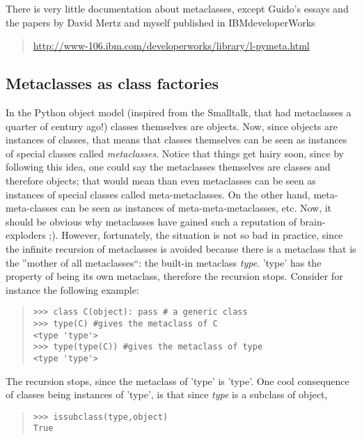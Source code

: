 \documentclass[10pt,english]{article}
\begin{document}
There is very little documentation about metaclasses, except Guido's
essays and the papers by David Mertz and myself published in IBMdeveloperWorks
\begin{quote}

\href{http://www-106.ibm.com/developerworks/library/l-pymeta.html}{http://www-106.ibm.com/developerworks/library/l-pymeta.html}
\end{quote}



\hypertarget{metaclasses-as-class-factories}{}
\subsection*{Metaclasses as class factories}

In the Python object model (inspired from the Smalltalk, that had metaclasses 
a quarter of century ago!) classes themselves are objects. 
Now, since objects are instances of classes, that means that classes 
themselves can be seen as instances of special classes called \emph{metaclasses}.
Notice that things get hairy soon, since by following this idea, one could 
say the metaclasses themselves are classes and therefore objects;  that 
would mean than even metaclasses can be seen as 
instances of special classes called meta-metaclasses. On the other hand,
meta-meta-classes can be seen as instances of meta-meta-metaclasses,
etc. Now, it should be obvious why metaclasses have gained such a 
reputation of brain-exploders ;). However, fortunately, the situation 
is not so bad in practice, since the infinite recursion of metaclasses is 
avoided because there is a metaclass that is the ''mother of all metaclasses``: 
the built-in metaclass \emph{type}. 'type' has the property of being its own 
metaclass, therefore the recursion stops. Consider for instance the following
example:
\begin{quote}
\begin{verbatim}>>> class C(object): pass # a generic class
>>> type(C) #gives the metaclass of C
<type 'type'>
>>> type(type(C)) #gives the metaclass of type
<type 'type'>\end{verbatim}
\end{quote}

The recursion stops, since the metaclass of 'type' is 'type'.
One cool consequence of classes being instances of 'type', 
is that since \emph{type} is a subclass of object,
\begin{quote}
\begin{verbatim}>>> issubclass(type,object)
True \end{verbatim}
\end{quote}
\end{document}
